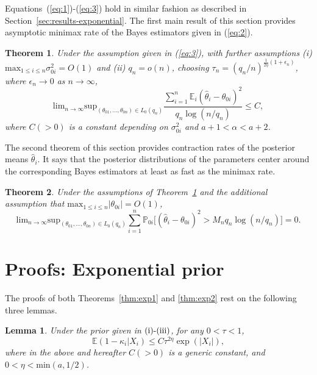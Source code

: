 \documentclass[sn-basic]{sn-jnl}%
\theoremstyle{thmstyleone}%
\newtheorem{theorem}{Theorem}[section]%
\newtheorem{lemma}{Lemma}[section]%
\begin{document}
\noindent
Equations~(\ref{eq:1})-(\ref{eq:3}) hold in similar fashion as described in Section~\ref{sec:results-exponential}. The first main result of this section provides asymptotic minimax rate of
the Bayes estimators given in (\ref{eq:2}).\\

\noindent
\begin{theorem}\label{thm:ig1}
Under the assumption given in (\ref{eq:3}), with further assumptions (i)  
$\mbox{max}_{1\leq i\leq n}\sigma_{0i}^2=O(1)$ and
(ii) $q_n=o(n)$, choosing $\tau_n=(q_n/n)^{\frac{1}{2\eta}(1+\epsilon_n)}$, where
$\epsilon_n\rightarrow 0$ as $n\rightarrow\infty$,
\begin{equation}
\mbox{lim}_{n\rightarrow\infty}
\mbox{sup}_{(\theta_{01},\ldots,\theta_{0n})\in L_0(q_n)}
\frac{\sum_{i=1}^n \mathbb{E}_{i}(\hat{\theta}_i-\theta_{0i})^2}
{q_n\log(n/q_n)}\leq C,
\label{eq:theorem1}
\end{equation}
where $C(>0)$ is a constant depending on $\sigma_{0i}^2$ and $a+1<\alpha<a+2$.
\end{theorem}

\noindent
The second theorem of this section provides contraction rates of the 
posterior means $\hat{\theta}_i$. It says that the posterior distributions
of the parameters center around the corresponding Bayes estimators at least
as fast as the minimax rate.\\

\noindent
\begin{theorem}\label{thm:ig2}
Under the assumptions of Theorem~\ref{thm:ig1} and the additional assumption that
$\mbox{max}_{1\leq i\leq n}|\theta_{0i}|=O(1)$,
\begin{equation}
\mbox{lim}_{n\rightarrow\infty}
\mbox{sup}_{(\theta_{01},\ldots,\theta_{0n})\in L_0(q_n)}
\sum_{i=1}^n \mathbb{P}_{0i}[(\hat{\theta}_i-\theta_{0i})^2>M_n{q_n\log(n/q_n)]}=0.
\label{eq:theorem2}
\end{equation}
\end{theorem}


\section{Proofs: Exponential prior}\label{sec:proofs-exponential}

\noindent
The proofs of both Theorems~\ref{thm:exp1} and \ref{thm:exp2} rest on the following three lemmas.

\begin{lemma}\label{lem:exp1}
Under the prior given in $\textnormal{(i)-(iii)}$, for any $0<\tau<1$,
\[
\mathbb{E}(1-\kappa_i|X_i)\leq C\tau^{2\eta}\exp(|X_i|),
\]
where in the above and hereafter $C(>0)$ is a generic constant, and 
$0<\eta<\mbox{min}(a,1/2)$.\\
\end{lemma}
\end{document}
